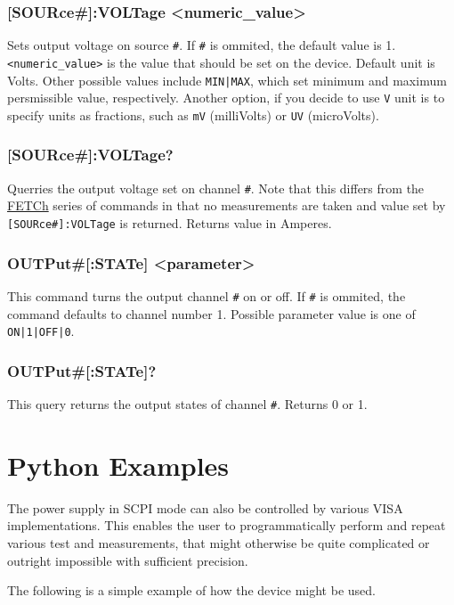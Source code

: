 \documentclass[a4paper,10pt]{article}
\begin{document}
		\subsubsection{[SOURce\#]:VOLTage <numeric\_value>}
		        Sets output voltage on source \verb|#|. If \verb|#| is ommited, the default value is 1.
		        \newline
		        \verb|<numeric_value>| is the value that should be set on the device. Default unit is Volts. Other possible values include \verb!MIN|MAX!, which set minimum and maximum persmissible value, respectively. Another option, if you decide to use \verb|V| unit is to specify units as fractions, such as \verb|mV| (milliVolts) or \verb|UV| (microVolts). 
		\subsubsection{[SOURce\#]:VOLTage?}
		        Querries the output voltage set on channel \verb|#|. Note that this differs from the \hyperlink{FETCh}{FETCh} series of commands in that no measurements are taken and value set by \verb|[SOURce#]:VOLTage| is returned.
		        \newline
		        Returns value in Amperes.
		\subsubsection{OUTPut\#[:STATe] <parameter>}
		        This command turns the output channel \verb!#! on or off. If \verb|#| is ommited, the command defaults to channel number 1.
		        \newline Possible parameter value is one of \verb!ON|1|OFF|0!.
		\subsubsection{OUTPut\#[:STATe]?}
		        This query returns the output states of channel \verb!#!. Returns 0 or 1.

\section{Python Examples}

The power supply in SCPI mode can also be controlled by various VISA implementations. This enables the user to programmatically perform and repeat various test and measurements, that might otherwise be quite complicated or outright impossible with sufficient precision.

The following is a simple example of how the device might be used.
\end{document}

